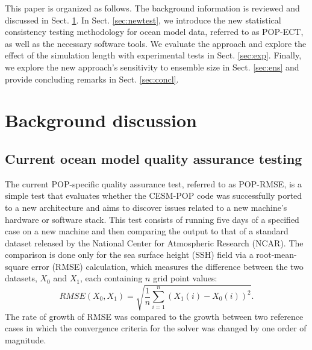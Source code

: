 \documentclass[gmd, manuscript]{copernicus}
\begin{document}
This paper is organized as follows.  The background information is reviewed and discussed in Sect. \ref{sec:back}.  In Sect. \ref{sec:newtest}, we introduce the new statistical consistency testing methodology for ocean model data, referred to as POP-ECT, as well as the necessary software tools. We evaluate the approach and explore the effect of the simulation length with experimental tests in Sect. \ref{sec:exp}.  Finally, we explore the new approach's sensitivity to ensemble size in Sect. \ref{sec:ens} and provide concluding remarks in Sect. \ref{sec:concl}.

\section{Background discussion} \label{sec:back}

\subsection{Current ocean model quality assurance testing}

The current POP-specific quality assurance test, referred to as POP-RMSE, is a simple test that evaluates whether the CESM-POP code was successfully ported to a new architecture and aims to discover issues related to a new machine's hardware or software stack.  This test consists of running five days of a specified case on a new machine and then comparing the output to that of a standard dataset released by the National Center for Atmospheric Research (NCAR).  The comparison is done only for the sea surface height (SSH) field via a root-mean-square error (RMSE) calculation, which measures the difference between the two datasets, $X_0$ and $X_1$, each containing $n$ grid point values:
 \begin{equation*}
 RMSE(X_0, X_1) = \sqrt{\frac{1}{n}\sum_{i=1}^n(X_1(i)-X_0(i))^2}.
 \end{equation*}
The rate of growth of RMSE was compared to the growth between two reference cases in which the convergence criteria for the solver was changed by one order of magnitude.  
\end{document}
